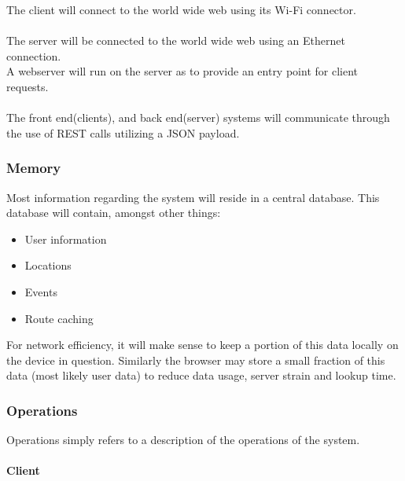 \documentclass[12pt,a4paper]{article}
\begin{document}
				The client will connect to the world wide web using its Wi-Fi connector. \\\\
				The server will be connected to the world wide web using an Ethernet connection. \\
				A webserver will run on the server as to provide an entry point for client requests.\\\\
				The front end(clients), and back end(server) systems will communicate through the use of 
				REST calls utilizing a JSON payload.  


			\subsubsection{Memory}

				Most information regarding the system will reside in a central
				database. This database will contain, amongst other things:

				\begin{itemize}
					\item User information
					\item Locations
					\item Events
					\item Route caching
				\end{itemize}

				For network efficiency, it will make sense to keep a portion of this
				data locally on the device in question. Similarly the browser may store
				a small fraction of this data (most likely user data) to reduce data
				usage, server strain and lookup time.

			\subsubsection{Operations}

				Operations simply refers to a description of the operations of the system. 
				
				\paragraph{Client}
				
\end{document}
